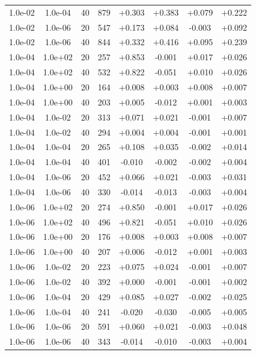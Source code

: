 \documentclass[12pt,a4paper]{article}
\begin{document}
\begin{table}
\begin{tabular}{*{8}c}
 1.0e-02 	 & 1.0e-04 	 & 40 & 879 	 & +0.303 & +0.383 & +0.079 & +0.222 \\ 
 1.0e-02 	 & 1.0e-06 	 & 20 & 547 	 & +0.173 & +0.084 & -0.003 & +0.092 \\
 1.0e-02 	 & 1.0e-06 	 & 40 & 844 	 & +0.332 & +0.416 & +0.095 & +0.239 \\ 
 \hline 
 1.0e-04 	 & 1.0e+02 	 & 20 & 257 	 & +0.853 & -0.001 & +0.017 & +0.026 \\ 
 1.0e-04 	 & 1.0e+02 	 & 40 & 532 	 & +0.822 & -0.051 & +0.010 & +0.026 \\ 
 1.0e-04 	 & 1.0e+00 	 & 20 & 164 	 & +0.008 & +0.003 & +0.008 & +0.007 \\ 
 1.0e-04 	 & 1.0e+00 	 & 40 & 203 	 & +0.005 & -0.012 & +0.001 & +0.003 \\  
 1.0e-04 	 & 1.0e-02 	 & 20 & 313 	 & +0.071 & +0.021 & -0.001 & +0.007 \\ 
 1.0e-04 	 & 1.0e-02 	 & 40 & 294 	 & +0.004 & +0.004 & -0.001 & +0.001 \\ 
 1.0e-04 	 & 1.0e-04 	 & 20 & 265 	 & +0.108 & +0.035 & -0.002 & +0.014 \\
 1.0e-04 	 & 1.0e-04 	 & 40 & 401 	 & -0.010 & -0.002 & -0.002 & +0.004 \\ 
 1.0e-04 	 & 1.0e-06 	 & 20 & 452 	 & +0.066 & +0.021 & -0.003 & +0.031 \\ 
 1.0e-04 	 & 1.0e-06 	 & 40 & 330 	 & -0.014 & -0.013 & -0.003 & +0.004 \\ 
 \hline
 1.0e-06 	 & 1.0e+02 	 & 20 & 274 	 & +0.850 & -0.001 & +0.017 & +0.026 \\ 
 1.0e-06 	 & 1.0e+02 	 & 40 & 496 	 & +0.821 & -0.051 & +0.010 & +0.026 \\
 1.0e-06 	 & 1.0e+00 	 & 20 & 176 	 & +0.008 & +0.003 & +0.008 & +0.007 \\ 
 1.0e-06 	 & 1.0e+00 	 & 40 & 207 	 & +0.006 & -0.012 & +0.001 & +0.003 \\ 
 1.0e-06 	 & 1.0e-02 	 & 20 & 223 	 & +0.075 & +0.024 & -0.001 & +0.007 \\ 
 1.0e-06 	 & 1.0e-02 	 & 40 & 392 	 & +0.000 & -0.001 & -0.001 & +0.002 \\ 
 1.0e-06 	 & 1.0e-04 	 & 20 & 429 	 & +0.085 & +0.027 & -0.002 & +0.025 \\ 
 1.0e-06 	 & 1.0e-04 	 & 40 & 241 	 & -0.020 & -0.030 & -0.005 & +0.005 \\ 
 1.0e-06 	 & 1.0e-06 	 & 20 & 591 	 & +0.060 & +0.021 & -0.003 & +0.048 \\ 
 1.0e-06 	 & 1.0e-06 	 & 40 & 343 	 & -0.014 & -0.010 & -0.003 & +0.004 \\ 

\end{tabular}
\label{TAB::timesteps}
\end{table} 
\end{document}
